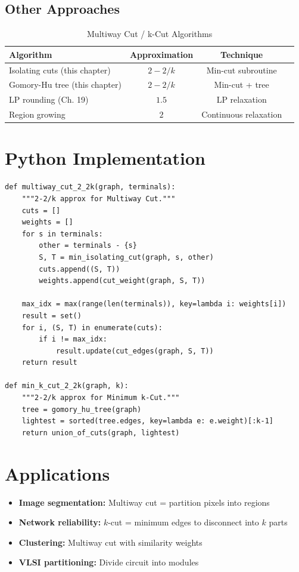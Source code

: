 \documentclass[11pt,oneside]{book}
\begin{document}
\subsection{Other Approaches}

\begin{table}[H]
\centering
\caption{Multiway Cut / k-Cut Algorithms}
\begin{tabular}{lccc}
\toprule
Algorithm & Approximation & Technique \\
\midrule
Isolating cuts (this chapter) & $2-2/k$ & Min-cut subroutine \\
Gomory-Hu tree (this chapter) & $2-2/k$ & Min-cut + tree \\
LP rounding (Ch. 19) & $1.5$ & LP relaxation \\
Region growing & $2$ & Continuous relaxation \\
\bottomrule
\end{tabular}
\end{table}

\section{Python Implementation}

\begin{lstlisting}[style=python, caption=Multiway Cut and k-Cut]
def multiway_cut_2_2k(graph, terminals):
    """2-2/k approx for Multiway Cut."""
    cuts = []
    weights = []
    for s in terminals:
        other = terminals - {s}
        S, T = min_isolating_cut(graph, s, other)
        cuts.append((S, T))
        weights.append(cut_weight(graph, S, T))
    
    max_idx = max(range(len(terminals)), key=lambda i: weights[i])
    result = set()
    for i, (S, T) in enumerate(cuts):
        if i != max_idx:
            result.update(cut_edges(graph, S, T))
    return result

def min_k_cut_2_2k(graph, k):
    """2-2/k approx for Minimum k-Cut."""
    tree = gomory_hu_tree(graph)
    lightest = sorted(tree.edges, key=lambda e: e.weight)[:k-1]
    return union_of_cuts(graph, lightest)
\end{lstlisting}

\section{Applications}
\begin{itemize}
    \item \textbf{Image segmentation:} Multiway cut = partition pixels into regions
    \item \textbf{Network reliability:} $k$-cut = minimum edges to disconnect into $k$ parts
    \item \textbf{Clustering:} Multiway cut with similarity weights
    \item \textbf{VLSI partitioning:} Divide circuit into modules
\end{itemize}
\end{document}
